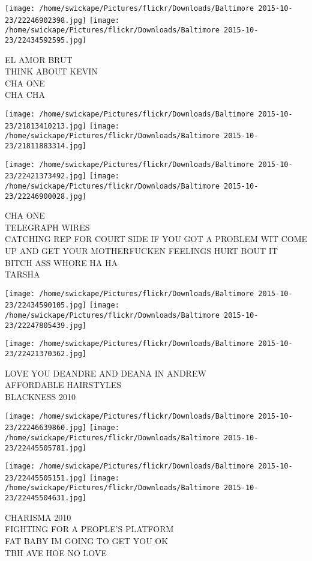 \documentclass[10pt,letterpaper]{article}
\begin{document}
\texttt{[image: /home/swickape/Pictures/flickr/Downloads/Baltimore 2015-10-23/22246902398.jpg]}
\texttt{[image: /home/swickape/Pictures/flickr/Downloads/Baltimore 2015-10-23/22434592595.jpg]}

EL AMOR BRUT\\
THINK ABOUT KEVIN\\
CHA ONE\\
CHA CHA
\pagebreak

\texttt{[image: /home/swickape/Pictures/flickr/Downloads/Baltimore 2015-10-23/21813410213.jpg]}
\texttt{[image: /home/swickape/Pictures/flickr/Downloads/Baltimore 2015-10-23/21811883314.jpg]}

\texttt{[image: /home/swickape/Pictures/flickr/Downloads/Baltimore 2015-10-23/22421373492.jpg]}
\texttt{[image: /home/swickape/Pictures/flickr/Downloads/Baltimore 2015-10-23/22246900028.jpg]}

CHA ONE\\
TELEGRAPH WIRES\\
CATCHING REP FOR COURT SIDE IF YOU GOT A PROBLEM WIT COME UP AND GET YOUR MOTHERFUCKEN FEELINGS HURT BOUT IT BITCH ASS WHORE HA HA\\
TARSHA
\pagebreak

\texttt{[image: /home/swickape/Pictures/flickr/Downloads/Baltimore 2015-10-23/22434590105.jpg]}
\texttt{[image: /home/swickape/Pictures/flickr/Downloads/Baltimore 2015-10-23/22247805439.jpg]}

\vspace{0.25in}
\texttt{[image: /home/swickape/Pictures/flickr/Downloads/Baltimore 2015-10-23/22421370362.jpg]}

LOVE YOU DEANDRE AND DEANA IN ANDREW\\
AFFORDABLE HAIRSTYLES\\
BLACKNESS 2010
\pagebreak

\texttt{[image: /home/swickape/Pictures/flickr/Downloads/Baltimore 2015-10-23/22246639860.jpg]}
\texttt{[image: /home/swickape/Pictures/flickr/Downloads/Baltimore 2015-10-23/22445505781.jpg]}

\texttt{[image: /home/swickape/Pictures/flickr/Downloads/Baltimore 2015-10-23/22445505151.jpg]}
\texttt{[image: /home/swickape/Pictures/flickr/Downloads/Baltimore 2015-10-23/22445504631.jpg]}

CHARISMA 2010\\
FIGHTING FOR A PEOPLE'S PLATFORM\\
FAT BABY IM GOING TO GET YOU OK\\
TBH AVE HOE NO LOVE
\pagebreak
\end{document}
